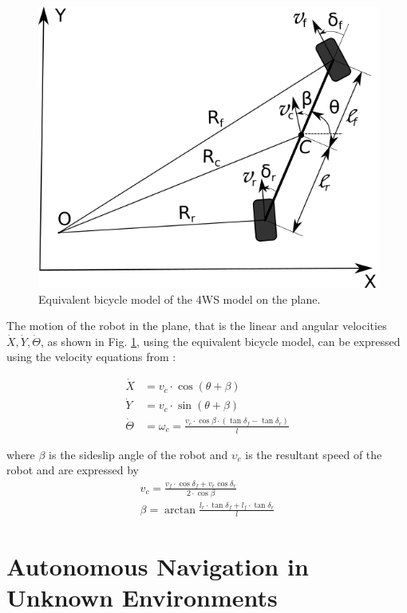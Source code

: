 \documentclass[conference]{IEEEtran}
\begin{document}
\begin{figure}[!ht]
	\centering
	\includegraphics[width=0.7\linewidth]{Figures/4ws_xy_plane.png}%
	\caption{Equivalent bicycle model of the 4WS model on the plane.}
	\label{fig:4ws_xy_plane}
\end{figure}

The motion of the robot in the plane, that is the linear and angular velocities $\dot X, \dot Y, \dot\Theta$, as shown in Fig. \ref{fig:4ws_xy_plane}, using the equivalent bicycle model, can be expressed using the velocity equations from \cite{4ws_trajectory_planning}:

\begin{align}
	\dot X &= v_c \cdot \cos(\theta + \beta)
	\label{eq:x_dot}\\
	\dot Y &= v_c \cdot \sin(\theta + \beta)
	\label{eq:y_dot}\\
	\dot \Theta &= \omega_c = \frac{v_c \cdot \cos{\beta} \cdot (\tan{\delta_f - \tan{\delta_r}})}{l}
	\label{eq:th_dot}
\end{align}

\noindent
where $\beta$ is the sideslip angle of the robot and $\upsilon_c$ is the resultant speed of the robot and are expressed by
\begin{align}
	v_c = \frac{v_f \cdot \cos{\delta_f} + v_r \cos{\delta_r}}{2 \cdot \cos{\beta}}
	\label{eq:v_c_f_r}\\[0.1cm]
	\beta = \arctan{\frac{l_r \cdot \tan{\delta_f} + l_f \cdot \tan{\delta_r}}{l}}
	\label{eq:beta}
\end{align}

\bigskip
\section{Autonomous Navigation in Unknown Environments} \label{sec:autonav}
\end{document}
